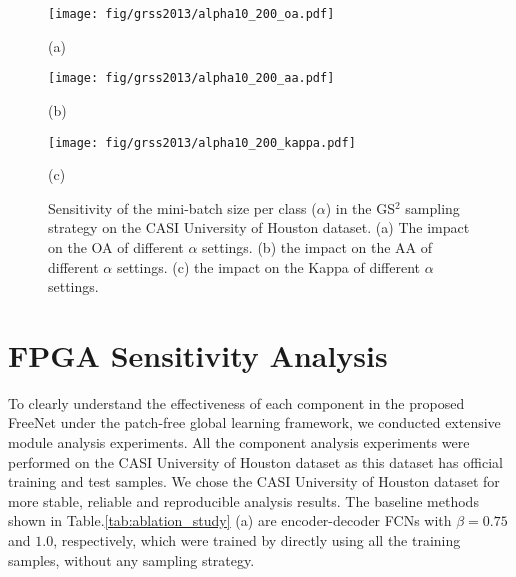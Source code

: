 \documentclass[journal]{IEEEtran}
\begin{document}
\begin{figure*}[htb]
  \begin{minipage}[b]{.32\linewidth}
    \centering
    \texttt{[image: fig/grss2013/alpha10\_200\_oa.pdf]}
    \centerline{(a)}
  \end{minipage}
  \hfill
  \begin{minipage}[b]{0.32\linewidth}
    \centering
    \texttt{[image: fig/grss2013/alpha10\_200\_aa.pdf]}
    \centerline{(b)}
  \end{minipage}
  \hfill
  \begin{minipage}[b]{0.32\linewidth}
    \centering
    \texttt{[image: fig/grss2013/alpha10\_200\_kappa.pdf]}
    \centerline{(c)}
  \end{minipage}
  \caption{Sensitivity of the mini-batch size per class ($\alpha$) in the GS$^2$ sampling strategy on the CASI University of Houston dataset.
    (a) The impact on the OA of different $\alpha$ settings.
    (b) the impact on the AA of different $\alpha$ settings.
    (c) the impact on the Kappa of different $\alpha$ settings.}
  \label{fig:alpha}
\end{figure*}






\section{FPGA Sensitivity Analysis}
To clearly understand the effectiveness of each component in the proposed FreeNet under the patch-free global learning framework, we conducted extensive module analysis experiments.
All the component analysis experiments were performed on the CASI University of Houston dataset as this dataset has official training and test samples.
We chose the CASI University of Houston dataset for more stable, reliable and reproducible analysis results.
The baseline methods shown in Table.\ref{tab:ablation_study} (a) are encoder-decoder FCNs with $\beta=0.75$ and $1.0$, respectively, which were trained by directly using all the training samples, without any sampling strategy.
\end{document}
